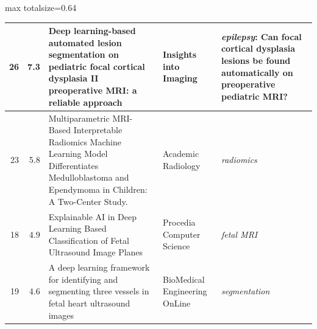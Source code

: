 \documentclass[aspectratio=169]{beamer}
\begin{document}
\begin{frame}
\begin{adjustbox}{max totalsize={\textwidth}{0.64\textheight}}
\begin{tabular}{|r|r|>{\raggedright\arraybackslash}p{}|>{\raggedright\arraybackslash}p{}|>{\raggedright\arraybackslash}p{}|}
26 & 7.3 & Deep learning-based automated lesion segmentation on pediatric focal cortical dysplasia II preoperative MRI: a reliable approach & Insights into Imaging & \textit{epilepsy}: Can focal cortical dysplasia lesions be found automatically on preoperative pediatric MRI? \\ \hline
23 & 5.8 & Multiparametric MRI-Based Interpretable Radiomics Machine Learning Model Differentiates Medulloblastoma and Ependymoma in Children: A Two-Center Study. & Academic Radiology & \textit{radiomics} \\ \hline
18 & 4.9 & Explainable AI in Deep Learning Based Classification of Fetal Ultrasound Image Planes & Procedia Computer Science & \textit{fetal MRI} \\ \hline
19 & 4.6 & A deep learning framework for identifying and segmenting three vessels in fetal heart ultrasound images & BioMedical Engineering OnLine & \textit{segmentation} \\ \hline
\end{tabular}
\end{adjustbox}
\\[1pt]
{\tiny }
\end{frame}
\end{document}
